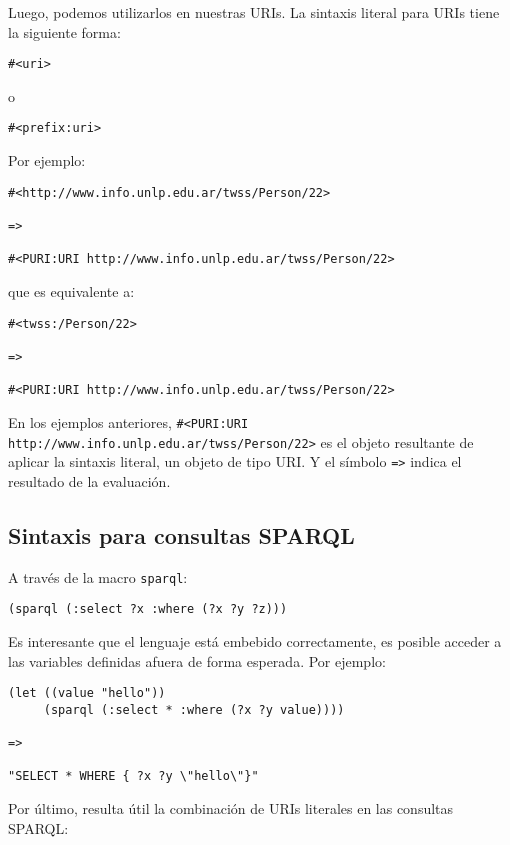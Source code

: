 \documentclass[12pt]{article}
\begin{document}
Luego, podemos utilizarlos en nuestras URIs. La sintaxis literal para URIs tiene la siguiente forma:

\begin{lstlisting}
#<uri>
\end{lstlisting}

o

\begin{lstlisting}
#<prefix:uri>
\end{lstlisting}

Por ejemplo:

\begin{lstlisting}
#<http://www.info.unlp.edu.ar/twss/Person/22> 

=> 

#<PURI:URI http://www.info.unlp.edu.ar/twss/Person/22>
\end{lstlisting}

que es equivalente a:

\begin{lstlisting}
#<twss:/Person/22> 

=> 

#<PURI:URI http://www.info.unlp.edu.ar/twss/Person/22>
\end{lstlisting}

En los ejemplos anteriores,  \verb=#<PURI:URI http://www.info.unlp.edu.ar/twss/Person/22>= es el objeto resultante de aplicar la sintaxis literal, un objeto de tipo URI. Y el s\'imbolo \verb#=># indica el resultado de la evaluaci\'on.

\subsection{Sintaxis para consultas SPARQL}

A trav\'es de la macro \verb=sparql=:
\begin{lstlisting}
(sparql (:select ?x :where (?x ?y ?z)))
\end{lstlisting}

Es interesante que el lenguaje est\'a embebido correctamente, es posible acceder a las variables definidas afuera de forma esperada. Por ejemplo:

\begin{lstlisting}
(let ((value "hello"))
	 (sparql (:select * :where (?x ?y value))))
	 
=> 

"SELECT * WHERE { ?x ?y \"hello\"}"	 
\end{lstlisting}

Por \'ultimo, resulta \'util la combinaci\'on de URIs literales en las consultas SPARQL:
\end{document}
